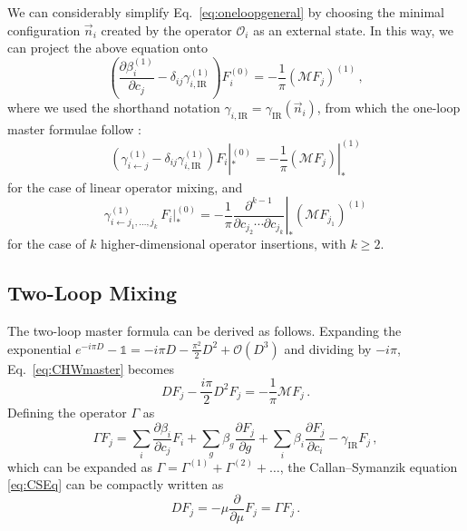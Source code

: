 We can considerably simplify Eq.~\eqref{eq:oneloopgeneral} 
by choosing the minimal configuration $\vec n_i$ created by the operator $\mathcal O_i$ as an external state. In this way, we can project the above equation onto
\begin{equation}
    \left(\frac{\partial \beta_i^{(1)}}{\partial c_j}  - \delta_{ij}\gamma_{i,\text{IR}}^{(1)}\right) F_i^{(0)} = -\frac{1}{\pi}(\mathcal M F_j)^{(1)}\,,
\end{equation}
where we used the shorthand notation $\gamma_{i,\text{IR}} = \gamma_{\text{IR}}(\vec n_i)$,
from which the one-loop master formulae follow \cite{Caron-Huot:2016cwu,EliasMiro:2020tdv}:
\begin{equation}
    \left(\gamma_{i\leftarrow j}^{(1)} - \delta_{ij}\gamma_{i,\text{IR}}^{(1)}\right) F_i|_*^{(0)} = -\frac{1}{\pi}(\mathcal M F_j)|_*^{(1)}
\end{equation}
for the case of linear operator mixing, and
\begin{equation}
    \gamma_{i\leftarrow j_1,\dotsc,j_k}^{(1)} \, F_i|_*^{(0)} = -\frac{1}{\pi}\left.\frac{\partial^{k-1}}{\partial c_{j_2} \dotsm \partial c_{j_k}}\right|_* (\mathcal M F_{j_1})^{(1)}
\end{equation}
for the case of $k$ higher-dimensional operator insertions, with $k\ge 2$.

\subsection{Two-Loop Mixing}

The two-loop master formula can be derived as follows. 
Expanding the exponential $e^{-i\pi D} - \mathbb{1} = -i\pi D - \frac{\pi^2}{2}D^2 + \mathcal O(D^3)$ and dividing by $-i\pi$, Eq.~\eqref{eq:CHWmaster} becomes
\begin{equation}\label{eq:CHWexpanded}
    D F_j - \frac{i\pi}{2}D^2 F_j = -\frac{1}{\pi}\mathcal M F_j\,.
\end{equation}
Defining the operator $\Gamma$ as
\begin{equation}\label{eq:Gammadef}
    \Gamma F_j = \sum_i \frac{\partial \beta_i}{\partial c_j}F_i 
    + \sum_g\beta_g\frac{\partial F_j}{\partial g} + \sum_i \beta_i\frac{\partial F_j}{\partial c_i}- \gamma_{\text{IR}}F_j\,,
\end{equation}
which can be expanded as $\Gamma = \Gamma^{(1)} + \Gamma^{(2)}+\dots$,
the Callan--Symanzik equation \eqref{eq:CSEq} can be compactly written as
\begin{equation}\label{eq:DGamma}
    D F_j = -\mu\frac{\partial}{\partial\mu}F_j = \Gamma F_j\,.
\end{equation}

